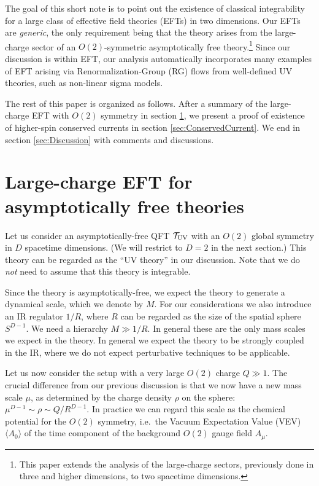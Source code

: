 \documentclass[12pt]{article}
\begin{document}
The goal of this short note is to point out the existence of classical integrability for a large class of 
effective field theories (EFTs) in two dimensions. Our EFTs are {\it generic}, the
only requirement being that the theory arises from the large-charge sector \cite{Hellerman:2015nra,Alvarez-Gaume:2016vff,Monin:2016jmo,Hellerman:2017efx,Jafferis:2017zna,Hellerman:2018sjf,Watanabe:2019pdh,Badel:2019oxl,Antipin:2020abu,Antipin:2020rdw,Gaume:2020bmp} of an $O(2)$-symmetric asymptotically free theory.\footnote{This paper extends the analysis of the large-charge sectors, previously done in three and higher dimensions, to two spacetime dimensions.}
Since our discussion is within EFT,
our analysis automatically incorporates many examples of EFT arising via Renormalization-Group (RG) flows from 
well-defined UV theories, such as non-linear sigma models.

The rest of this paper is organized as follows.
After a summary of the large-charge EFT with $O(2)$ symmetry  in section \ref{sec:LargeCharge},
we present a proof of existence of higher-spin conserved currents in section \ref{sec:ConservedCurrent}.
We end in section \ref{sec:Discussion} with comments and discussions.

\section{Large-charge EFT for asymptotically free theories} \label{sec:LargeCharge}

Let us consider an asymptotically-free QFT  $\mathcal{T}_{\rm UV}$
with an $O(2)$ global symmetry in $D$ spacetime dimensions.
(We will restrict to $D=2$ in the next section.)
This theory can be regarded as the ``UV theory'' in our discussion.
Note that we do {\it not} need to assume that this theory is integrable.

Since the theory is asymptotically-free, we expect the theory to generate a dynamical scale, which we denote by $M$. For our considerations we also introduce an IR regulator $1/R$, where $R$ can be regarded as the size of the spatial
sphere $S^{D-1}$. We need a  hierarchy $M \gg 1/R$. In general these are the only mass scales
we expect in the theory. In general we expect the theory to be strongly coupled in the IR,
where we do not expect perturbative techniques to be applicable.

Let us now consider the setup with a very large $O(2)$ charge $Q \gg 1$. The crucial difference from our previous discussion 
is that we now have a new mass scale $\mu$, as determined by the charge density $\rho$ on the sphere:
$\mu^{D-1} \sim \rho \sim Q/ R^{D-1}$. In practice we can regard this scale as the chemical potential for the $O(2)$ symmetry,
i.e.\ the Vacuum Expectation Value (VEV) $\langle A_0 \rangle$ of the 
time component of the background $O(2)$ gauge field $A_{\mu}$. 
\end{document}
